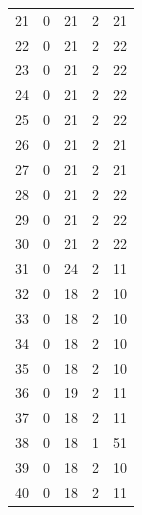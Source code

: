 \begin{appendices}
\begin{longtable}{lcccc}
21  &   0 &  21 &   2 &  21 \\
22  &   0 &  21 &   2 &  22 \\
23  &   0 &  21 &   2 &  22 \\
24  &   0 &  21 &   2 &  22 \\
25  &   0 &  21 &   2 &  22 \\
26  &   0 &  21 &   2 &  21 \\
27  &   0 &  21 &   2 &  21 \\
28  &   0 &  21 &   2 &  22 \\
29  &   0 &  21 &   2 &  22 \\
30  &   0 &  21 &   2 &  22 \\
31  &   0 &  24 &   2 &  11 \\
32  &   0 &  18 &   2 &  10 \\
33  &   0 &  18 &   2 &  10 \\
34  &   0 &  18 &   2 &  10 \\
35  &   0 &  18 &   2 &  10 \\
36  &   0 &  19 &   2 &  11 \\
37  &   0 &  18 &   2 &  11 \\
38  &   0 &  18 &   1 &  51 \\
39  &   0 &  18 &   2 &  10 \\
40  &   0 &  18 &   2 &  11 \\
\bottomrule
\end{longtable}


\end{appendices}
